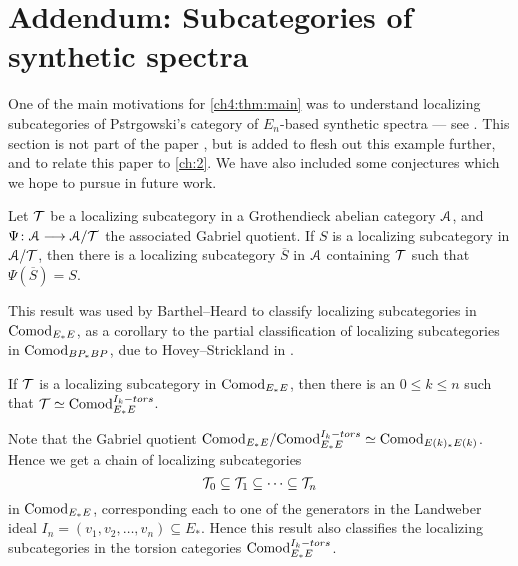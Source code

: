 
\section{Addendum: Subcategories of synthetic spectra}

One of the main motivations for \cref{ch4:thm:main} was to understand localizing subcategories of Pstr\a{}gowski's category of $E_n$-based synthetic spectra --- see \cite{pstragowski_2022}. This section is not part of the paper \cite{aambo_2024_localizing}, but is added to flesh out this example further, and to relate this paper to \cref{ch:2}. We have also included some conjectures which we hope to pursue in future work. 

\begin{proposition}
    Let $\mathcal{T}$ be a localizing subcategory in a Grothendieck abelian category $\EuScript{A}$, and $\Psi\colon\EuScript{A}\longrightarrow \EuScript{A}/\mathcal{T}$ the associated Gabriel quotient. If $S$ is a localizing subcategory in $\EuScript{A}/\mathcal{T}$, then there is a localizing subcategory $\overline{S}$ in $\EuScript{A}$ containing $\mathcal{T}$ such that $\Psi(\overline{S})=S$. 
\end{proposition}

This result was used by Barthel--Heard to classify localizing subcategories in $\mathrm{Comod}_{E_*E}$, as a corollary to the partial classification of localizing subcategories in $\mathrm{Comod}_{BP_*BP}$, due to Hovey--Strickland in \cite{hovey-strickland_2005a}. 

\begin{theorem}
    \label{thm:classification-of-HTTs}
    If $\mathcal{T}$ is a localizing subcategory in $\mathrm{Comod}_{E_*E}$, then there is an $0\leq k\leq n$ such that $\mathcal{T} \simeq \mathrm{Comod}_{E_*E}^{I_k-tors}$. 
\end{theorem}

\begin{remark}
    Note that the Gabriel quotient $\mathrm{Comod}_{E_*E}/\mathrm{Comod}_{E_*E}^{I_k-tors}\simeq \mathrm{Comod}_{E(k)_*E(k)}$. Hence we get a chain of localizing subcategories
    \[\mathcal{T}_0 \subseteq \mathcal{T}_1\subseteq \cdots \subseteq \mathcal{T}_n \]
    in $\mathrm{Comod}_{E_*E}$, corresponding each to one of the generators in the Landweber ideal $I_n=(v_1, v_2, \ldots, v_n)\subseteq E_*$. Hence this result also classifies the localizing subcategories in the torsion categories $\mathrm{Comod}_{E_*E}^{I_k-tors}$. 
\end{remark}

